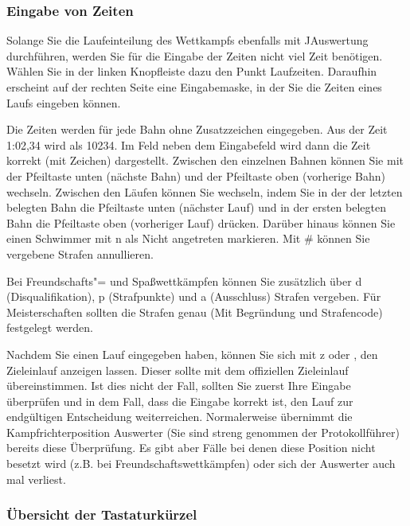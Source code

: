\documentclass[11pt,a4paper,twoside,ngerman]{article}
\begin{document}
\subsubsection*{Eingabe von Zeiten}
Solange Sie die Laufeinteilung des Wettkampfs ebenfalls mit JAuswertung durchführen, werden Sie für die Eingabe der Zeiten nicht viel Zeit benötigen. Wählen Sie in der linken Knopfleiste dazu den Punkt \glqq{}Laufzeiten\grqq{}. Daraufhin erscheint auf der rechten Seite eine Eingabemaske, in der Sie die Zeiten eines Laufs eingeben können.

Die Zeiten werden für jede Bahn ohne Zusatzzeichen eingegeben. Aus der Zeit 1:02,34 wird als 10234. Im Feld neben dem Eingabefeld wird dann die Zeit korrekt (mit Zeichen) dargestellt. Zwischen den einzelnen Bahnen können Sie mit der Pfeiltaste unten (nächste Bahn) und der Pfeiltaste oben (vorherige Bahn) wechseln. Zwischen den Läufen können Sie wechseln, indem Sie in der der letzten belegten Bahn die Pfeiltaste unten (nächster Lauf) und in der ersten belegten Bahn die Pfeiltaste oben (vorheriger Lauf) drücken. Darüber hinaus können Sie einen Schwimmer mit n als \glqq{}Nicht angetreten\grqq{} markieren. Mit \# können Sie vergebene Strafen annullieren.

Bei Freundschafts"= und Spaßwettkämpfen können Sie zusätzlich über d (Disqualifikation), p (Strafpunkte) und a (Ausschluss) Strafen vergeben. Für Meisterschaften sollten die Strafen genau (Mit Begründung und Strafencode) festgelegt werden.

Nachdem Sie einen Lauf eingegeben haben, können Sie sich mit z oder , den Zieleinlauf anzeigen lassen. Dieser sollte mit dem offiziellen Zieleinlauf übereinstimmen. Ist dies nicht der Fall, sollten Sie zuerst Ihre Eingabe überprüfen und in dem Fall, dass die Eingabe korrekt ist, den Lauf zur endgültigen Entscheidung weiterreichen. Normalerweise übernimmt die Kampfrichterposition \glqq{}Auswerter\grqq{} (Sie sind streng genommen der \glqq{}Protokollführer\grqq{}) bereits diese Überprüfung. Es gibt aber Fälle bei denen diese Position nicht besetzt wird (z.B. bei Freundschaftswettkämpfen) oder sich der Auswerter auch mal \glqq{}verliest\grqq{}.


\subsubsection*{Übersicht der Tastaturkürzel}
\end{document}
